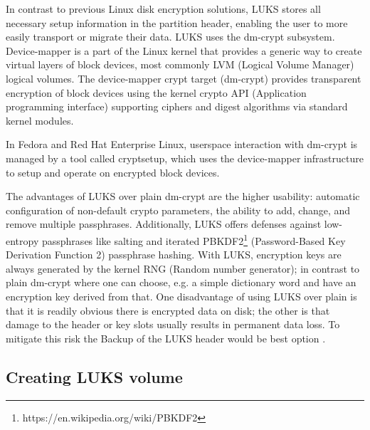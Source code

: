 In contrast to previous Linux disk encryption solutions, LUKS stores all necessary setup information in the partition header, enabling the user to more easily transport or migrate their data.
LUKS uses the dm-crypt subsystem.
Device-mapper is a part of the Linux kernel that provides a generic way to create virtual layers of block devices, most commonly LVM (Logical Volume Manager) logical volumes.
The device-mapper crypt target (dm-crypt) provides transparent encryption of block devices using the kernel crypto API (Application programming interface) supporting ciphers and digest algorithms via standard kernel modules.

In Fedora and Red Hat Enterprise Linux, userspace interaction with dm-crypt is managed by a tool called cryptsetup, which uses the device-mapper infrastructure to setup and operate on encrypted block devices.

The advantages of LUKS over plain dm-crypt are the higher usability: automatic configuration of non-default crypto parameters, the ability to add, change, and remove multiple passphrases.
Additionally, LUKS offers defenses against low-entropy passphrases like salting and iterated PBKDF2\footnote{https://en.wikipedia.org/wiki/PBKDF2} (Password-Based Key Derivation Function 2) passphrase hashing.
With LUKS, encryption keys are always generated by the kernel RNG (Random number generator); in contrast to plain dm-crypt where one can choose, e.g. a simple dictionary word and have an encryption key derived from that.
One disadvantage of using LUKS over plain is that it is readily obvious there is encrypted data on disk; the other is that damage to the header or key slots usually results in permanent data loss.
To mitigate this risk the Backup of the LUKS header would be best option \cite{fruhwirth2005luks}.

\subsection{Creating LUKS volume}\label{createLUKS}

